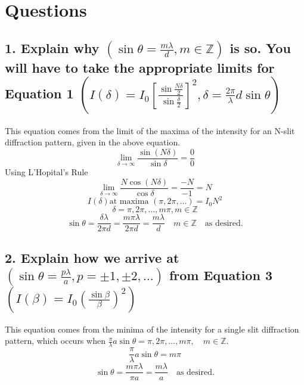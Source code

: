 \documentclass[12pt]{article}
\begin{document}
\section{Questions}
\subsection*{1. Explain why $(\sin\theta=\frac{m\lambda}{d}, m\in\mathbb{Z})$ is so. You will have to take the appropriate limits for Equation 1 $\left(I(\delta)=I_0\left[\frac{\sin\frac{N\delta}{2}}{\sin\frac{\delta}{2}}\right]^2, \delta= \frac{2\pi}{\lambda}d\sin\theta\right)$}
\noindent This equation comes from the limit of the maxima of the intensity for an N-slit diffraction pattern, given in the above equation.
\[\lim_{\delta\rightarrow\infty}\frac{\sin(N\delta)}{\sin\delta}=\frac{0}{0}\]
Using L'Hopital's Rule
\[\lim_{\delta\rightarrow\infty}\frac{N\cos(N\delta)}{\cos\delta}=\frac{-N}{-1}=N\]
\[I(\delta)\text{at maxima } (\pi,2\pi,\dots)=I_0N^2\]
\[\delta=\pi,2\pi,\dots,m\pi,  m\in \mathbb{Z}\]
\[\sin\theta=\frac{\delta\lambda}{2\pi d}=\frac{m\pi\lambda}{2\pi d}=\frac{m\lambda}{d} \quad m\in\mathbb{Z}\quad\text{as desired.}\]
\subsection*{2. Explain how we arrive at $\left(\sin\theta=\frac{p\lambda}{a}, p=\pm1,\pm2,\dots\right)$ from Equation 3 $\left(I(\beta)=I_0\left(\frac{\sin\beta}{\beta}\right)^2 \right)$}
\noindent This equation comes from the minima of the intensity for a single slit diffraction pattern, which occurs when $\frac{\pi}{\lambda}a\sin\theta=\pi,2\pi,\dots, m\pi,\quad m\in\mathbb{Z}$.
\[\frac{\pi}{\lambda}a\sin\theta=m\pi\]
\[\sin\theta=\frac{m\pi\lambda}{\pi a}=\frac{m\lambda}{a}\quad\text{as desired.}\]
\end{document}
